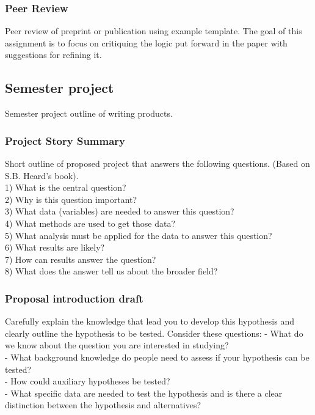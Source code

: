 \documentclass[11pt,]{article}
\begin{document}
\hypertarget{peer-review}{%
\subsubsection{Peer Review}\label{peer-review}}

Peer review of preprint or publication using example template. The goal
of this assignment is to focus on critiquing the logic put forward in
the paper with suggestions for refining it.

\hypertarget{semester-project}{%
\subsection{Semester project}\label{semester-project}}

Semester project outline of writing products.

\hypertarget{project-story-summary}{%
\subsubsection{Project Story Summary}\label{project-story-summary}}

Short outline of proposed project that answers the following questions.
(Based on S.B. Heard's book).\\
1) What is the central question?\\
2) Why is this question important?\\
3) What data (variables) are needed to answer this question?\\
4) What methods are used to get those data?\\
5) What analysis must be applied for the data to answer this question?\\
6) What results are likely?\\
7) How can results answer the question?\\
8) What does the answer tell us about the broader field?

\hypertarget{proposal-introduction-draft}{%
\subsubsection{Proposal introduction
draft}\label{proposal-introduction-draft}}

Carefully explain the knowledge that lead you to develop this hypothesis
and clearly outline the hypothesis to be tested. Consider these
questions: - What do we know about the question you are interested in
studying?\\
- What background knowledge do people need to assess if your hypothesis
can be tested?\\
- How could auxiliary hypotheses be tested?\\
- What specific data are needed to test the hypothesis and is there a
clear distinction between the hypothesis and alternatives?
\end{document}
